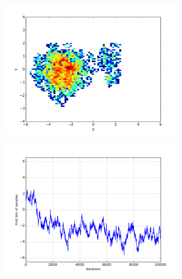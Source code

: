 \begin{figure}
\begin{center}
  
  \begin{subfigure}{.5\textwidth}
    \centering
    \includegraphics[width=\textwidth]{figure_CC_RWM_small_Histo}
  \end{subfigure}%
  \begin{subfigure}{.5\textwidth}
    \centering
    \includegraphics[width=\textwidth]{figure_CC_RWM_small_2}
  \end{subfigure}
  \vspace*{1mm}
  \label{fig:HeuristicHistoPlotRWM-small}
  \vspace*{3mm}
  

\end{center}
\end{figure}

